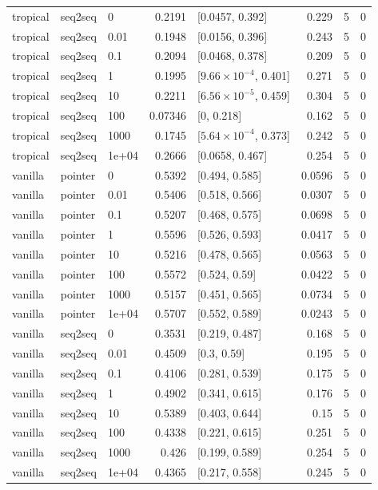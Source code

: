 \documentclass[10pt]{article}
\begin{document}
{\begin{longtable}{lllrlrrr}
tropical & seq2seq & 0 & 0.2191 & [0.0457, 0.392] & 0.229 & 5 & 0\\
tropical & seq2seq & 0.01 & 0.1948 & [0.0156, 0.396] & 0.243 & 5 & 0\\
tropical & seq2seq & 0.1 & 0.2094 & [0.0468, 0.378] & 0.209 & 5 & 0\\
tropical & seq2seq & 1 & 0.1995 & [$9.66\times10^{-4}$, 0.401] & 0.271 & 5 & 0\\
tropical & seq2seq & 10 & 0.2211 & [$6.56\times10^{-5}$, 0.459] & 0.304 & 5 & 0\\
tropical & seq2seq & 100 & 0.07346 & [0, 0.218] & 0.162 & 5 & 0\\
tropical & seq2seq & 1000 & 0.1745 & [$5.64\times10^{-4}$, 0.373] & 0.242 & 5 & 0\\
tropical & seq2seq & 1e+04 & 0.2666 & [0.0658, 0.467] & 0.254 & 5 & 0\\
vanilla & pointer & 0 & 0.5392 & [0.494, 0.585] & 0.0596 & 5 & 0\\
vanilla & pointer & 0.01 & 0.5406 & [0.518, 0.566] & 0.0307 & 5 & 0\\
vanilla & pointer & 0.1 & 0.5207 & [0.468, 0.575] & 0.0698 & 5 & 0\\
vanilla & pointer & 1 & 0.5596 & [0.526, 0.593] & 0.0417 & 5 & 0\\
vanilla & pointer & 10 & 0.5216 & [0.478, 0.565] & 0.0563 & 5 & 0\\
vanilla & pointer & 100 & 0.5572 & [0.524, 0.59] & 0.0422 & 5 & 0\\
vanilla & pointer & 1000 & 0.5157 & [0.451, 0.565] & 0.0734 & 5 & 0\\
vanilla & pointer & 1e+04 & 0.5707 & [0.552, 0.589] & 0.0243 & 5 & 0\\
vanilla & seq2seq & 0 & 0.3531 & [0.219, 0.487] & 0.168 & 5 & 0\\
vanilla & seq2seq & 0.01 & 0.4509 & [0.3, 0.59] & 0.195 & 5 & 0\\
vanilla & seq2seq & 0.1 & 0.4106 & [0.281, 0.539] & 0.175 & 5 & 0\\
vanilla & seq2seq & 1 & 0.4902 & [0.341, 0.615] & 0.176 & 5 & 0\\
vanilla & seq2seq & 10 & 0.5389 & [0.403, 0.644] & 0.15 & 5 & 0\\
vanilla & seq2seq & 100 & 0.4338 & [0.221, 0.615] & 0.251 & 5 & 0\\
vanilla & seq2seq & 1000 & 0.426 & [0.199, 0.589] & 0.254 & 5 & 0\\
vanilla & seq2seq & 1e+04 & 0.4365 & [0.217, 0.558] & 0.245 & 5 & 0\\
\bottomrule
\end{longtable}
}
\end{document}
